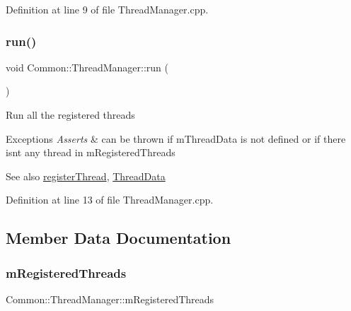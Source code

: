 Definition at line 9 of file Thread\+Manager.\+cpp.

\mbox{\label{class_common_1_1_thread_manager_adeceb4a130b2a8987e724dfda0efccbb}} 
\subsubsection{\texorpdfstring{run()}{run()}}
{\footnotesize\ttfamily void Common\+::\+Thread\+Manager\+::run (\begin{DoxyParamCaption}{ }\end{DoxyParamCaption})\hspace{0.3cm}{\ttfamily [virtual]}}

Run all the registered threads 
\begin{DoxyExceptions}{Exceptions}
{\em Asserts} & can be thrown if m\+Thread\+Data is not defined or if there isn\textquotesingle{}t any thread in m\+Registered\+Threads \\
\hline
\end{DoxyExceptions}
\begin{DoxySeeAlso}{See also}
\hyperlink{class_common_1_1_thread_manager_a79a947a3ff5c8a34e51cc41007832aeb}{register\+Thread}, \hyperlink{struct_common_1_1_thread_data}{Thread\+Data} 
\end{DoxySeeAlso}


Definition at line 13 of file Thread\+Manager.\+cpp.



\subsection{Member Data Documentation}
\mbox{\label{class_common_1_1_thread_manager_a92ea3cda744e1e89df5b27111caed238}} 
\subsubsection{\texorpdfstring{m\+Registered\+Threads}{mRegisteredThreads}}
{\footnotesize\ttfamily Common\+::\+Thread\+Manager\+::m\+Registered\+Threads\hspace{0.3cm}{\ttfamily [protected]}}

